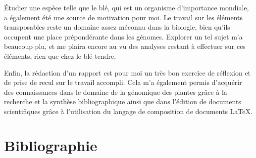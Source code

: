 \documentclass[a4paper, 12pt]{article}
\newcommand{\nocontentsline}[3]{}
\newcommand{\tocless}[2]{\bgroup\let\addcontentsline=\nocontentsline#1{#2}\egroup}
\begin{document}
\begin{onehalfspace}
Étudier une espèce telle que le blé, qui est un organisme d'importance mondiale, a également été une source de motivation pour moi. Le travail sur les éléments transposables reste un domaine assez méconnu dans la biologie, bien qu'ils occupent une place prépondérante dans les génomes. Explorer un tel sujet m'a beaucoup plu, et me plaira encore au vu des analyses restant à effectuer sur ces éléments, rien que chez le blé tendre.

Enfin, la rédaction d'un rapport est pour moi un très bon exercice de réflexion et de prise de recul sur le travail accompli. Cela m'a également permis d'acquérir des connaissances dans le domaine de la génomique des plantes grâce à la recherche et la synthèse bibliographique ainsi que dans l'édition de documents scientifiques grâce à l'utilisation du langage de composition de documents \LaTeX.

\newpage
\thispagestyle{empty}
\null


\newpage
\pagestyle{empty}
\tocless\part{Bibliographie}
\begin{flushleft}


\end{flushleft}
\end{onehalfspace}
\end{document}
